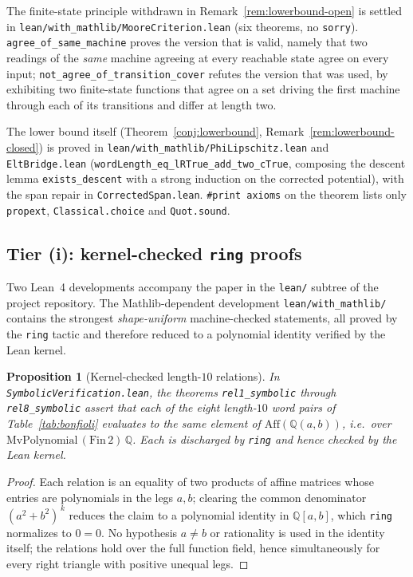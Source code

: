 \documentclass[11pt]{article}
\theoremstyle{plain}
\newtheorem{proposition}[theorem]{Proposition}
\theoremstyle{definition}
\theoremstyle{remark}
\begin{document}
The finite-state principle withdrawn in Remark~\ref{rem:lowerbound-open} is settled in
\texttt{lean/with\_mathlib/MooreCriterion.lean} (six theorems, no \texttt{sorry}).
\texttt{agree\_of\_same\_machine} proves the version that is valid, namely that two readings of
the \emph{same} machine agreeing at every reachable state agree on every input;
\texttt{not\_agree\_of\_transition\_cover} refutes the version that was used, by exhibiting two
finite-state functions that agree on a set driving the first machine through each of its
transitions and differ at length two.

The lower bound itself (Theorem~\ref{conj:lowerbound}, Remark~\ref{rem:lowerbound-closed}) is
proved in \texttt{lean/with\_mathlib/PhiLipschitz.lean} and \texttt{EltBridge.lean}
(\texttt{wordLength\_eq\_lRTrue\_add\_two\_cTrue}, composing the descent lemma
\texttt{exists\_descent} with a strong induction on the corrected potential), with the span
repair in \texttt{CorrectedSpan.lean}. \texttt{\#print axioms} on the theorem lists only
\texttt{propext}, \texttt{Classical.choice} and \texttt{Quot.sound}.

\subsection{Tier (i): kernel-checked \texttt{ring} proofs}
\label{ssec:reproduce-ring}

Two Lean~4 developments accompany the paper in the \texttt{lean/} subtree
of the project repository. The Mathlib-dependent development
\texttt{lean/with\_mathlib/} contains the strongest \emph{shape-uniform}
machine-checked statements, all proved by the \texttt{ring} tactic and
therefore reduced to a polynomial identity verified by the Lean kernel.

\begin{proposition}[Kernel-checked length-$10$ relations]
\label{prop:lean-ring-relations}
In \texttt{SymbolicVerification.lean}, the theorems
\texttt{rel1\_symbolic} through \texttt{rel8\_symbolic} assert that each
of the eight length-$10$ word pairs of Table~\ref{tab:bonfioli} evaluates
to the same element of $\mathrm{Aff}(\mathbb{Q}(a,b))$, i.e.\ over
$\mathrm{MvPolynomial}\,(\mathrm{Fin}\,2)\,\mathbb{Q}$. Each is
discharged by \texttt{ring} and hence checked by the Lean kernel.
\end{proposition}

\begin{proof}
Each relation is an equality of two products of affine matrices whose
entries are polynomials in the legs $a,b$; clearing the common
denominator $(a^2+b^2)^{\,k}$ reduces the claim to a polynomial identity
in $\mathbb{Q}[a,b]$, which \texttt{ring} normalizes to $0=0$. No
hypothesis $a\neq b$ or rationality is used in the identity itself; the
relations hold over the full function field, hence simultaneously for
every right triangle with positive unequal legs.
\end{proof}
\end{document}
